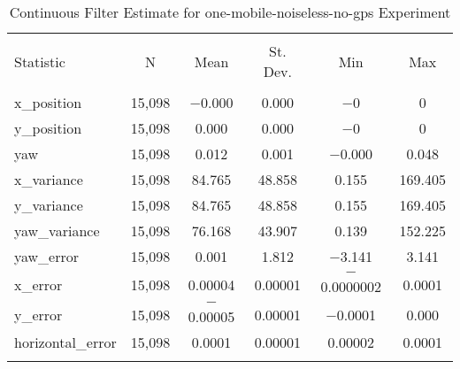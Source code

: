 
\begin{table}[h] \centering 
  \caption{Continuous Filter Estimate for one-mobile-noiseless-no-gps Experiment} 
  \label{tab:one_mobile_noiseless_no_gps_continuous_summary} 
\begin{tabular}{@{\extracolsep{5pt}}lccccc} 
\\[-1.8ex]\hline 
\hline \\[-1.8ex] 
Statistic & \multicolumn{1}{c}{N} & \multicolumn{1}{c}{Mean} & \multicolumn{1}{c}{St. Dev.} & \multicolumn{1}{c}{Min} & \multicolumn{1}{c}{Max} \\ 
\hline \\[-1.8ex] 
x\_position & 15,098 & $-$0.000 & \num{0.000} & $-$0 & 0 \\ 
y\_position & 15,098 & \num{0.000} & \num{0.000} & $-$0 & 0 \\ 
yaw & 15,098 & \num{0.012} & \num{0.001} & $-$0.000 & \num{0.048} \\ 
x\_variance & 15,098 & \num{84.765} & \num{48.858} & \num{0.155} & \num{169.405} \\ 
y\_variance & 15,098 & \num{84.765} & \num{48.858} & \num{0.155} & \num{169.405} \\ 
yaw\_variance & 15,098 & \num{76.168} & \num{43.907} & \num{0.139} & \num{152.225} \\ 
yaw\_error & 15,098 & \num{0.001} & \num{1.812} & $-$3.141 & \num{3.141} \\ 
x\_error & 15,098 & \num{0.00004} & \num{0.00001} & $-$0.0000002 & \num{0.0001} \\ 
y\_error & 15,098 & $-$0.00005 & \num{0.00001} & $-$0.0001 & \num{0.000} \\ 
horizontal\_error & 15,098 & \num{0.0001} & \num{0.00001} & \num{0.00002} & \num{0.0001} \\ 
\hline \\[-1.8ex] 
\end{tabular} 
\end{table} 
